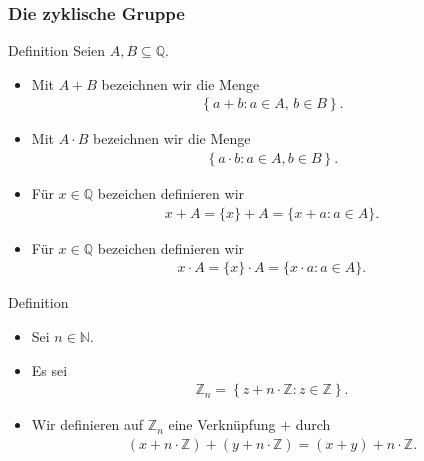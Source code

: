 \documentclass{beamer}
\newcommand\NN{\mathbb N}
\newcommand\ZZ{\mathbb Z}
\newcommand\QQ{\mathbb Q}
\newcommand\cbc[1]{\left\{{#1}\right\}}
\newcommand{\ue}{\"u}
\begin{document}
\begin{frame}\frametitle{Die zyklische Gruppe}
	\begin{overprint}
		\begin{block}{Definition}
			Seien $A,B\subseteq\QQ$. 
			\begin{itemize}
				\item Mit $A+B$ bezeichnen wir die Menge
					\begin{align*}
						\cbc{a+b:a\in A,\,b\in B}.
					\end{align*}
				\item Mit $A\cdot B$ bezeichnen wir die Menge
					\begin{align*}
						\cbc{a\cdot b:a\in A,b\in B}.
					\end{align*}
				\item F\ue r $x\in\QQ$ bezeichen definieren wir
					\begin{align*}
						x+A=\{x\}+A=\{x+a:a\in A\}.
					\end{align*}
				\item F\ue r $x\in\QQ$ bezeichen definieren wir
					\begin{align*}
						x\cdot A=\{x\}\cdot A=\{x\cdot a:a\in A\}.
					\end{align*}
			\end{itemize}
		\end{block}	
		\begin{block}{Definition}
			\begin{itemize}
				\item Sei $n\in\NN$.
				\item Es sei
					\begin{align*}
						\ZZ_n=\cbc{z+n\cdot\ZZ:z\in\ZZ}.
					\end{align*}
				\item Wir definieren auf $\ZZ_n$ eine Verkn\ue pfung $+$ durch
					\begin{align*}
						(x+n\cdot\ZZ)+(y+n\cdot\ZZ)=(x+y)+n\cdot\ZZ.
					\end{align*}
			\end{itemize}
		\end{block}
	\end{overprint}
\end{frame}
\end{document}
